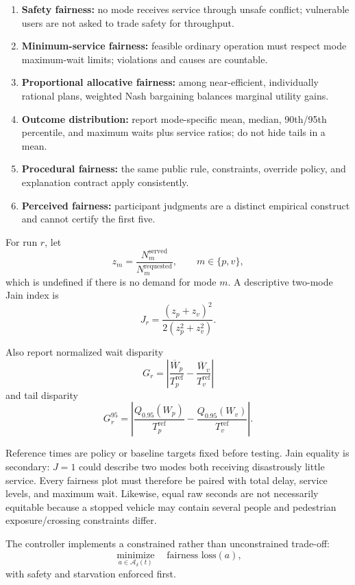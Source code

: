 \documentclass[
  english,
  11pt,
  a4paper,
]{article}
\providecommand{\tightlist}{%
  \setlength{\itemsep}{0pt}\setlength{\parskip}{0pt}}
\begin{document}
\begin{enumerate}
\def\labelenumi{\arabic{enumi}.}
\tightlist
\item
  \textbf{Safety fairness:} no mode receives service through unsafe
  conflict; vulnerable users are not asked to trade safety for
  throughput.
\item
  \textbf{Minimum-service fairness:} feasible ordinary operation must
  respect mode maximum-wait limits; violations and causes are countable.
\item
  \textbf{Proportional allocative fairness:} among near-efficient,
  individually rational plans, weighted Nash bargaining balances
  marginal utility gains.
\item
  \textbf{Outcome distribution:} report mode-specific mean, median,
  90th/95th percentile, and maximum waits plus service ratios; do not
  hide tails in a mean.
\item
  \textbf{Procedural fairness:} the same public rule, constraints,
  override policy, and explanation contract apply consistently.
\item
  \textbf{Perceived fairness:} participant judgments are a distinct
  empirical construct and cannot certify the first five.
\end{enumerate}

For run \(r\), let
\[
  z_m = \frac{N_m^{\mathrm{served}}}{N_m^{\mathrm{requested}}},
  \qquad m\in\{p,v\},
\]
which is undefined if there is no demand for mode \(m\). A descriptive
two-mode Jain index is
\[
  J_r = \frac{(z_p+z_v)^2}{2\left(z_p^2+z_v^2\right)}.
\]

Also report normalized wait disparity
\[
  G_r =
  \left|
    \frac{\overline{W}_p}{T_p^{\mathrm{ref}}}
    -
    \frac{\overline{W}_v}{T_v^{\mathrm{ref}}}
  \right|
\]
and tail disparity
\[
  G_r^{95} =
  \left|
    \frac{Q_{0.95}(W_p)}{T_p^{\mathrm{ref}}}
    -
    \frac{Q_{0.95}(W_v)}{T_v^{\mathrm{ref}}}
  \right|.
\]

Reference times are policy or baseline targets fixed before testing.
Jain equality is secondary: \(J=1\) could describe two modes both
receiving disastrously little service. Every fairness plot must
therefore be paired with total delay, service levels, and maximum wait.
Likewise, equal raw seconds are not necessarily equitable because a
stopped vehicle may contain several people and pedestrian
exposure/crossing constraints differ.

The controller implements a constrained rather than unconstrained
trade-off:
\[
  \underset{a\in\mathcal{A}_{\delta}(t)}{\operatorname{minimize}}
  \quad \text{fairness loss}(a),
\]
with safety and starvation enforced first.
\end{document}
